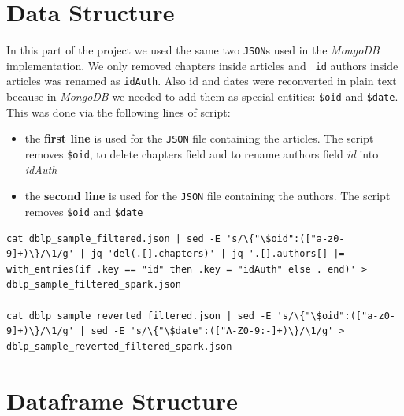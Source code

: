 \documentclass{Configuration_Files/PoliMi3i_thesis}
\begin{document}
\chapter{Data Structure}
\label{ch:data_struct}
In this part of the project we used the same two \verb|JSON|s used in the \emph{MongoDB} implementation. We only removed
chapters inside articles and \verb|_id| authors inside articles was renamed as \verb|idAuth|. Also id and dates were reconverted
in plain text because in \emph{MongoDB} we needed to add them as special entities: \verb|$oid| and \verb|$date|.\newline
This was done via the following lines of script:
\begin{itemize}
    \item the \textbf{first line} is used for the \verb |JSON| file containing the articles. The script removes \verb|$oid|, to
        delete chapters field and to rename authors field \emph{id} into \emph{idAuth}
    \item the \textbf{second line} is used for the \verb |JSON| file containing the authors. The script removes \verb|$oid| and
        \verb|$date| \\
\end{itemize}
\begin{lstlisting}
cat dblp_sample_filtered.json | sed -E 's/\{"\$oid":(["a-z0-9]+)\}/\1/g' | jq 'del(.[].chapters)' | jq '.[].authors[] |= with_entries(if .key == "id" then .key = "idAuth" else . end)' > dblp_sample_filtered_spark.json

cat dblp_sample_reverted_filtered.json | sed -E 's/\{"\$oid":(["a-z0-9]+)\}/\1/g' | sed -E 's/\{"\$date":(["A-Z0-9:-]+)\}/\1/g' > dblp_sample_reverted_filtered_spark.json
\end{lstlisting}

\chapter{Dataframe Structure}
\label{ch:frame_struct}
\end{document}
